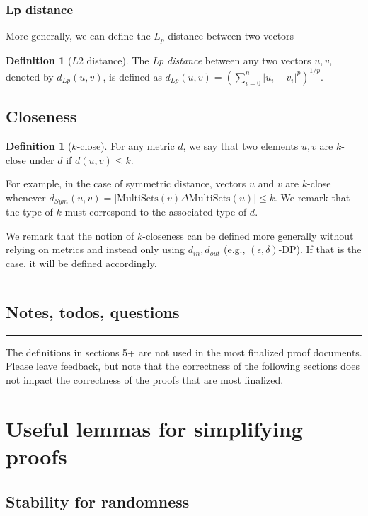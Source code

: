 \documentclass[11pt,a4paper]{article}
\theoremstyle{definition}
\newtheorem{definition}[theorem]{Definition}
\newcommand{\horizline}{\noindent\rule{\textwidth}{1pt}}
\newcommand{\din}{d_{in}}
\newcommand{\dout}{d_{out}}
\begin{document}
\subsubsection{Lp distance}
    More generally, we can define the $L_p$ distance between two vectors
\begin{definition}[$L2$ distance]
    The \textit{Lp distance} between any two vectors $u, v$, denoted by $d_{Lp}(u, v)$, is defined as $d_{Lp}(u, v) = (\sum_{i=0}^n |u_i - v_i|^p)^{1/p}$.
\end{definition}

\subsection{Closeness}
\begin{definition}[$k$-close]
For any metric $d$, we say that two elements $u, v$ are $k$-close under $d$ if $d(u, v) \leq k$.
\end{definition}

For example, in the case of symmetric distance, vectors $u$ and $v$ are $k$-close whenever $d_{Sym}(u, v) = |\textrm{MultiSets}(v) \Delta \textrm{MultiSets}(u)| \leq k$. We remark that the type of $k$ must correspond to the associated type of $d$.

We remark that the notion of $k$-closeness can be defined more generally without relying on metrics and instead only using $\din, \dout$ (e.g., $(\epsilon, \delta)$-DP). If that is the case, it will be defined accordingly.

\horizline

\subsection{Notes, todos, questions}

\horizline

{\Large\color{red} The definitions in sections 5+ are not used in the most finalized proof documents. Please leave feedback, but note that the correctness of the following sections does not impact the correctness of the proofs that are most finalized.}

\section{Useful lemmas for simplifying proofs}

\subsection{Stability for randomness}
\end{document}
